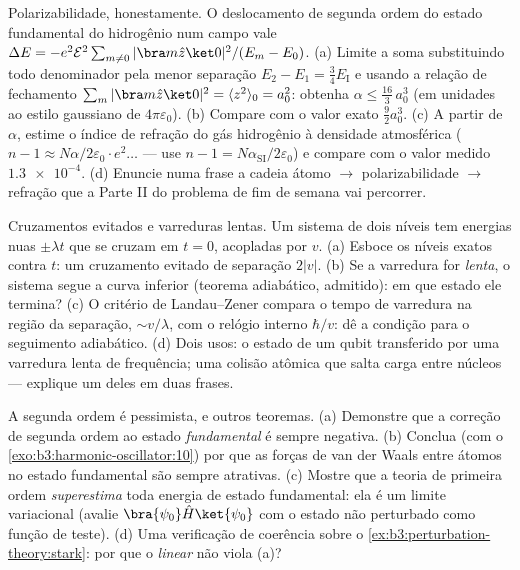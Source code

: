 \begin{exercise}[$\star\star\star$]\label{exo:b3:perturbation-theory:10}
Polarizabilidade, honestamente. O deslocamento de segunda ordem do
estado fundamental do hidrogênio num campo vale
$\Delta E = -e^2\mathcal E^2\sum_{m\neq
0}|\bra m\hat z\ket 0|^2/(E_m - E_0)$. (a) Limite a soma substituindo
todo denominador pela menor separação $E_2 - E_1 =
\tfrac34 E_{\text{I}}$ e usando a relação de fechamento $\sum_m|\bra
m\hat z\ket0|^2 = \langle z^2\rangle_0 = a_0^2$: obtenha $\alpha
\le \tfrac{16}3\,a_0^3$ (em unidades ao estilo gaussiano de
$4\pi\varepsilon_0$). (b) Compare com o valor exato $\tfrac92 a_0^3$.
(c) A partir de $\alpha$, estime o índice de refração do gás
hidrogênio à densidade atmosférica ($n - 1 \approx N\alpha/2\varepsilon_0
\cdot e^2\dots$ --- use $n - 1 = N\alpha_{\text{SI}}/2
\varepsilon_0$) e compare com o valor medido $\num{1.3e-4}$.
(d) Enuncie numa frase a cadeia átomo $\to$ polarizabilidade $\to$
refração que a Parte II do problema de fim de semana vai percorrer.
\end{exercise}

\begin{exercise}[$\star\star\star$]\label{exo:b3:perturbation-theory:11}
Cruzamentos evitados e varreduras lentas. Um sistema de dois níveis tem
energias nuas $\pm\lambda t$ que se cruzam em $t = 0$, acopladas por
$v$. (a) Esboce os níveis exatos contra $t$: um cruzamento evitado de
separação $2|v|$. (b) Se a varredura for \emph{lenta}, o sistema segue a
curva inferior (teorema adiabático, admitido): em que estado ele
termina? (c) O critério de Landau--Zener compara o tempo de varredura
na região da separação, $\sim v/\lambda$, com o relógio interno
$\hbar/v$: dê a condição para o seguimento adiabático. (d) Dois usos: o
estado de um qubit transferido por uma varredura lenta de frequência;
uma colisão atômica que salta carga entre núcleos --- explique um deles
em duas frases.
\end{exercise}

\begin{exercise}[$\star\star\star$]\label{exo:b3:perturbation-theory:12}
A segunda ordem é pessimista, e outros teoremas. (a) Demonstre que a
correção de segunda ordem ao estado \emph{fundamental} é sempre
negativa. (b) Conclua (com o
\cref{exo:b3:harmonic-oscillator:10}) por que as forças de van der
Waals entre átomos no estado fundamental são sempre atrativas. (c)
Mostre que a teoria de primeira ordem \emph{superestima} toda energia
de estado fundamental: ela é um limite variacional (avalie $\bra{\psi_0}\hat
H\ket{\psi_0}$ com o estado não perturbado como
função de teste). (d) Uma verificação de coerência sobre o
\cref{ex:b3:perturbation-theory:stark}: por que o 
\emph{linear} não viola (a)?
\end{exercise}

